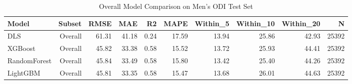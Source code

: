\begin{table}[htbp]
\centering
\caption{Overall Model Comparison on Men's ODI Test Set}
\label{tab:overall_comparison}
\begin{tabular}{lrrrrrrrrr}
\toprule
Model & Subset & RMSE & MAE & R2 & MAPE & Within_5 & Within_10 & Within_20 & N \\
\midrule
DLS & Overall & 61.31 & 41.18 & 0.24 & 17.59 & 13.94 & 25.86 & 42.93 & 25392 \\
XGBoost & Overall & 45.82 & 33.38 & 0.58 & 15.52 & 13.72 & 25.93 & 44.41 & 25392 \\
RandomForest & Overall & 45.84 & 33.49 & 0.58 & 15.80 & 13.42 & 25.40 & 44.26 & 25392 \\
LightGBM & Overall & 45.81 & 33.35 & 0.58 & 15.47 & 13.68 & 26.01 & 44.63 & 25392 \\
\bottomrule
\end{tabular}
\end{table}